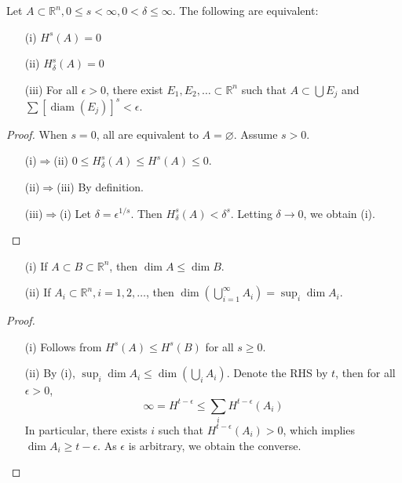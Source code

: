     \begin{proposition}\label{prop:hausdorff-dim-properties}
        Let $A\subset \mathbb{R}^{n}, 0\leq s<\infty, 0<\delta\leq \infty$. The following are equivalent:
        \begin{itemize}
            \item[(i)] $H^{s}(A)=0$
            \item[(ii)] $H^{s}_{\delta}(A)=0$
            \item[(iii)] For all $\epsilon >0$, there exist $E_{1},E_{2},\dots \subset \mathbb{R}^{n}$ such that $A \subset\bigcup E_{j}$ and $\sum[\operatorname{diam}(E_{j})]^{s}<\epsilon$.
        \end{itemize}
    \end{proposition}
    \begin{proof}
        When $s=0$, all are equivalent to $A= \varnothing$. Assume $s>0$.
        \begin{itemize}
            \item[(i)$\Rightarrow$(ii)] $0\leq H_{\delta}^{s}(A)\leq H^{s}(A)\leq 0$.
            \item[(ii)$\Rightarrow$(iii)] By definition.
            \item[(iii)$\Rightarrow$(i)] Let $\delta =\epsilon ^{1/s}$. Then $H^{s}_{\delta}(A)<\delta ^{s}$. Letting $\delta\to 0$, we obtain (i).\qedhere
        \end{itemize}
    \end{proof}

    \begin{proposition}\label{prop:hausdorff-dim-monotonicity}
        \begin{itemize}
            \item[(i)] If $A\subset B\subset \mathbb{R}^{n}$, then $\operatorname{dim}A\leq \operatorname{dim}B$.
            \item[(ii)] If $A_{i}\subset \mathbb{R}^{n},i=1,2,\dots$, then $\operatorname{dim}\left( \bigcup _{i=1}^{\infty} A_{i}\right)=\sup_{i}\operatorname{dim}A_{i}$.
        \end{itemize}
    \end{proposition}
    \begin{proof}
        \begin{itemize}
            \item[(i)] Follows from $H^{s}(A)\leq H^{s}(B)$ for all $s\geq 0$.
            \item[(ii)] By (i), $\sup_{i}\operatorname{dim}A_{i}\leq \operatorname{dim}\left( \bigcup _{i}A_{i} \right)$. Denote the RHS by $t$, then for all $\epsilon> 0$,
            \[
            \infty=H^{t-\epsilon}\leq \sum _{i}H^{t-\epsilon}(A_{i})
            \]
            In particular, there exists $i$ such that $H^{t-\epsilon}(A_{i})>0$, which implies $\operatorname{dim}A_{i}\geq t-\epsilon$. As $\epsilon$ is arbitrary, we obtain the converse.\qedhere
        \end{itemize}
    \end{proof}

